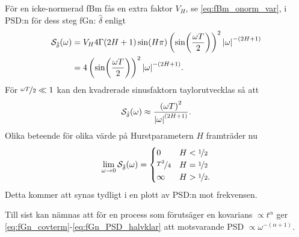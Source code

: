 För en icke-normerad fBm fås en extra faktor $V_H$, se \eqref{eq:fBm_onorm_var}, i PSD:n för dess steg fGn: $\hat{\delta}$ enligt
\begin{equation} \label{eq:fGn_PSD}
\begin{aligned}
\mathcal{S}_{\hat{\delta}}(\omega) 
&= V_H 4\Gamma{(2H+1)}\sin(H\pi) \left( \sin(\frac{\omega T}{2}) \right)^2 \abs{\omega}^{-(2H+1)} 
\\
&= 4 \left( \sin(\frac{\omega T}{2}) \right) ^2\abs{\omega}^{-(2H+1)}.
\end{aligned}
\end{equation}
För $\nicefrac{\omega T}{2} \ll 1$ kan den kvadrerade sinusfaktorn taylorutvecklas så att
\begin{equation}
    \mathcal{S}_{\hat{\delta}}(\omega) \approx \frac{ \left( \omega T \right)^2}{\abs{\omega}^{(2H+1)}}.
\end{equation}
Olika beteende för olika värde på Hurstparametern $H$ framträder nu 
\begin{equation}
    \lim\limits_{\omega \to 0} \mathcal{S}_{\hat{\delta}}(\omega) = \begin{cases} 
      0 & H<\nicefrac{1}{2} \\
      \nicefrac{T^2}{4} & H=\nicefrac{1}{2} \\
      \infty & H>\nicefrac{1}{2}.
   \end{cases}
\end{equation}
Detta kommer att synas tydligt i en plott av PSD:n mot frekvensen.

Till sist kan nämnas att för en process som förutsäger en kovarians $\propto t^{\alpha}$ ger \eqref{eq:fGn_covterm}-\eqref{eq:fGn_PSD_halvklar} att motsvarande PSD $\propto \omega^{-(\alpha+1)}$.





